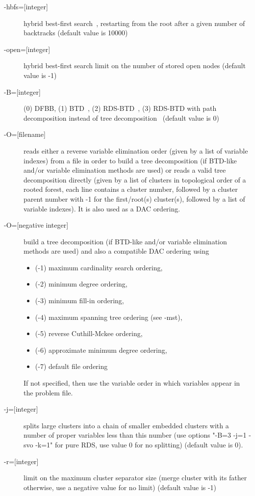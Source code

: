 \documentclass{article}
\begin{document}
\begin{description}
\item[{-hbfs=[integer]}] hybrid best-first search~\cite{Katsirelos15a}, restarting from the
  root after a given number of backtracks (default value is 10000)
\item[{-open=[integer]}] hybrid best-first search limit on the number
  of stored open nodes (default value is -1)
\item[{-B=[integer]}] (0) DFBB, (1) BTD~\cite{Schiex06a}, (2) RDS-BTD~\cite{Sanchez09a}, (3) RDS-BTD with
  path decomposition instead of tree decomposition~\cite{Sanchez09a} (default value is
  0)
\item[{-O=[filename]}] reads either a reverse variable elimination order (given by a list of variable indexes) from a file
  in order to build a tree decomposition (if BTD-like and/or variable
  elimination methods are used) or reads a valid tree decomposition directly (given by a list of clusters in topological order of a rooted forest, each line contains a cluster number, followed by a cluster parent number with -1 for the first/root(s) cluster(s), followed by a list of variable indexes). It is also used as a DAC ordering.
\item[{-O=[negative integer]}] build a tree decomposition (if BTD-like
  and/or variable elimination methods are used) and also a compatible
  DAC ordering using
  \begin{itemize}
    \item (-1) maximum cardinality search ordering, 
    \item (-2) minimum degree ordering, 
    \item (-3) minimum fill-in ordering,
    \item (-4) maximum spanning tree ordering (see -mst), 
    \item (-5) reverse Cuthill-Mckee ordering, 
    \item (-6) approximate minimum degree ordering,
    \item (-7) default file ordering
    \end{itemize}
    If not specified, then use the variable order in which variables appear in the problem file.
\item[{-j=[integer]}] splits large clusters into a chain of smaller embedded clusters with a number of proper variables less than this number (use options "-B=3 -j=1 -svo -k=1" for pure RDS, use value 0 for no splitting) (default value is 0).
\item[{-r=[integer]}] limit on the maximum cluster separator size (merge cluster with its father otherwise, use a negative value for no limit) (default value is -1)

\end{description}
\end{document}
